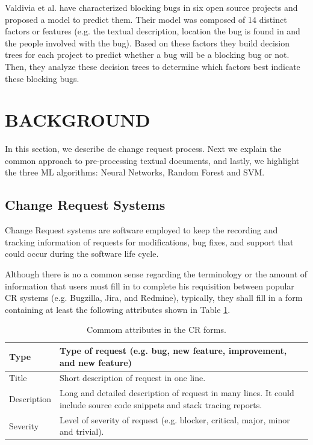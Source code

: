\documentclass[10pt, conference]{IEEEtran}
\begin{document}
Valdivia et al.\cite{ValdiviaGarcia2014} have characterized blocking bugs in six open source projects and proposed a model to predict them. Their model was composed of 14 distinct factors or features (e.g. the textual description, location the bug is found in and the people involved with the bug). Based on these factors they build decision trees for each project to predict whether a bug will be a blocking bug or not. Then, they analyze these decision trees to determine which factors best indicate these blocking bugs. 

\section{BACKGROUND}
In this section, we describe de change request process. Next we explain the common approach to pre-processing textual documents, and lastly, we highlight the three ML algorithms: Neural Networks, Random Forest and SVM.

\subsection{Change Request Systems}
Change Request systems\cite{Pressman2009} are software employed to keep the recording and tracking information of requests for modifications, bug fixes, and support that could occur during the software life cycle. 

Although there is no a common sense regarding the terminology or the amount of information that users must fill in to complete his requisition between popular CR systems (e.g. Bugzilla, Jira, and Redmine)\cite{Tian2012}, typically, they shall fill in a form containing at least the following attributes shown in Table \ref{tab:commom_attributes_cr_form}. 

\begin{table}[!ht]
	\renewcommand{\arraystretch}{1.3}
	\caption{Commom attributes in the CR forms.}
	\label{tab:commom_attributes_cr_form}
	\centering
	\begin{tabular}{|l|p{6cm}|}
		\hline
		Type & Type of request (e.g. bug, new feature, improvement, and new feature)\\
		\hline
		Title & Short description of request in one line.\\
		\hline
		Description & Long and detailed description of request in many lines. It could include source code snippets and stack tracing reports.\\
		\hline
		Severity & Level of severity of request (e.g. blocker, critical, major, minor and trivial).\\
		\hline 
	\end{tabular}
\end{table}
\end{document}
